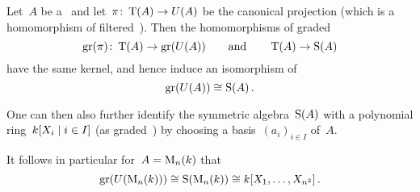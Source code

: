 \begin{theorem}[{\pbw}]
  Let~$A$ be a~{\kalg} and let~$\pi \colon \operatorname{T}(A) \to U(A)$ be the canonical projection (which is a homomorphism of filtered~{\kalg}).
  Then the homomorphisms of graded~{\kalgs}
  \[
            \operatorname{gr}(\pi)
    \colon  \operatorname{T}(A)
    \to     \operatorname{gr}(U(A))
    \qquad\text{and}\qquad
        \operatorname{T}(A)
    \to \operatorname{S}(A)
  \]
  have the same kernel, and hence induce an isomorphism of~{\kalgs}
  \[
          \operatorname{gr}(U(A))
    \cong \operatorname{S}(A) \,.
  \]
\end{theorem}

One can then also further identify the symmetric algebra~$\operatorname{S}(A)$ with a polynomial ring~$k[X_i \suchthat i \in I]$ (as graded~{\kalgs}) by choosing a basis~$(a_i)_{i \in I}$ of~$A$.

It follows in particular for~$A = \operatorname{M}_{n}(k)$ that
\[
        \operatorname{gr}(U(\operatorname{M}_{n}(k)))
  \cong \operatorname{S}(\operatorname{M}_{n}(k))
  \cong k[X_1, \dotsc, X_{n^2}] \,.
\]














